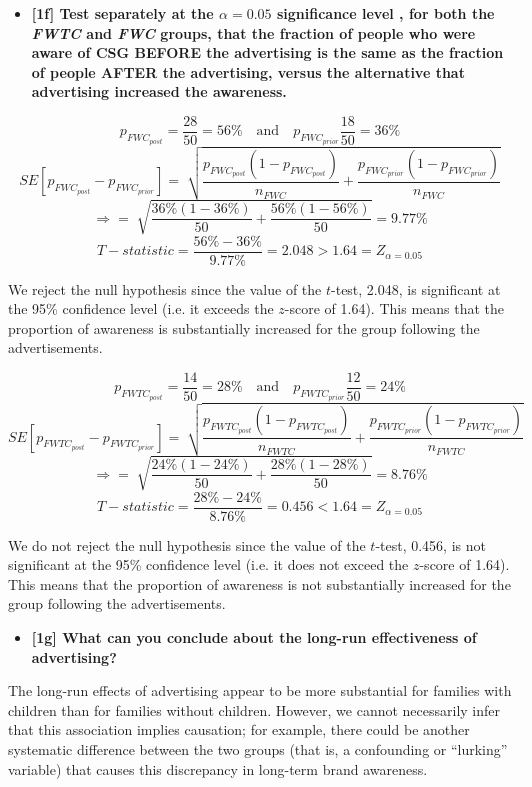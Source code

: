 \documentclass[10pt, oneside,spanish]{article}
\begin{document}
\begin{itemize}
\item \textbf{ [1f]   Test separately at the $\alpha = 0.05$ significance level , for both the \textit{FWTC} and \textit{FWC} groups, that the fraction of people who were aware of CSG BEFORE the advertising is the same as the fraction of people AFTER the advertising, versus the alternative that advertising increased the awareness.  }
\end{itemize}

$$ p_{FWC_{post}} = \frac{28}{50} = 56\%   \quad \textrm{and} \quad   p_{FWC_{prior}} \frac{18}{50} = 36\% $$
$$ SE[p_{FWC_{post}} - p_{FWC_{prior}}] = \sqrt[]{\frac{p_{FWC_{post}} (1 - p_{FWC_{post}})}{n_{FWC}} + \frac{p_{FWC_{prior}} (1 - p_{FWC_{prior}})}{n_{FWC}}} $$
$$ \Rightarrow = \sqrt[]{\frac{ 36\%  (1 - 36\% )}{50} + \frac{ 56\%  (1 - 56\% )}{50} } = 9.77\% $$
$$T-statistic = \frac{56\% - 36\%}{9.77\%} = 2.048 > 1.64 = Z_{\alpha=0.05}  $$

We reject the null hypothesis since the value of the $t$-test, 2.048, is significant at the 95\% confidence level (i.e. it exceeds the $z$-score of 1.64). This means that the proportion of awareness is substantially increased for the group following the advertisements. 


$$ p_{FWTC_{post}} = \frac{14}{50} = 28\%   \quad \textrm{and} \quad   p_{FWTC_{prior}} \frac{12}{50} = 24\% $$
$$ SE[p_{FWTC_{post}} - p_{FWTC_{prior}}] = \sqrt[]{\frac{p_{FWTC_{post}} (1 - p_{FWTC_{post}})}{n_{FWTC}} + \frac{p_{FWTC_{prior}} (1 - p_{FWTC_{prior}})}{n_{FWTC}}} $$
$$ \Rightarrow = \sqrt[]{\frac{ 24\%  (1 - 24\% )}{50} + \frac{ 28\%  (1 - 28\% )}{50} } = 8.76\% $$
$$T-statistic = \frac{28\% - 24\%}{8.76\%} = 0.456 < 1.64 = Z_{\alpha=0.05}  $$

We do not reject the null hypothesis since the value of the $t$-test, 0.456, is not significant at the 95\% confidence level (i.e. it does not exceed the $z$-score of 1.64). This means that the proportion of awareness is not substantially increased for the group following the advertisements. 

\begin{itemize}
\item \textbf{ [1g]  What can you conclude about the long-run effectiveness of advertising?   }
\end{itemize}

The long-run effects of advertising appear to be more substantial for families with children than for families without children. However, we cannot necessarily infer that this association implies causation; for example, there could be another systematic difference between the two groups (that is, a confounding or “lurking” variable) that causes this discrepancy in long-term brand awareness. 
\end{document}
